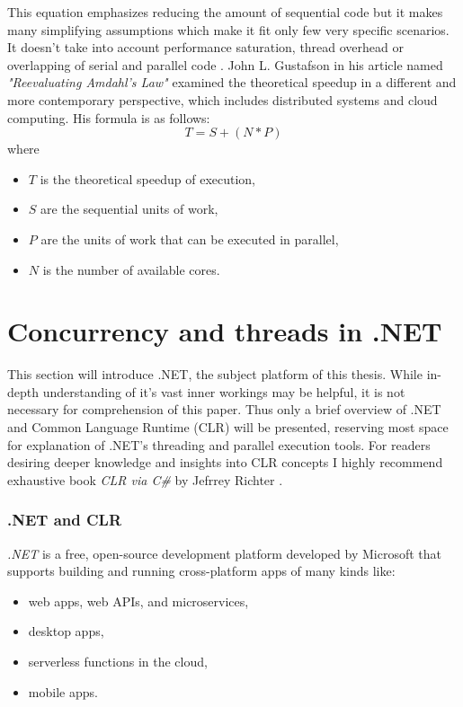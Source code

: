 This equation emphasizes reducing the amount of sequential code but it makes many simplifying assumptions which make it fit only few very specific scenarios. It doesn't take into account performance saturation, thread overhead or overlapping of serial and parallel code \cite{Popov2010}.
John L. Gustafson in his article named \emph{"Reevaluating Amdahl's Law"} \cite{Gustafson1988} examined the theoretical speedup in a different and more contemporary perspective, which includes distributed systems and cloud computing. His formula is as follows: 
\begin{equation}
T = S + (N*P)
\end{equation}
where
\begin{itemize}
	\item $T$ is the theoretical speedup of execution,
	\item $S$ are the sequential units of work,
	\item $P$ are the units of work that can be executed in parallel,
	\item $N$ is the number of available cores.
\end{itemize}

\section{Concurrency and threads in .NET}
This section will introduce .NET, the subject platform of this thesis. While in-depth understanding of it's vast inner workings may be helpful, it is not necessary for comprehension of this paper. Thus only a brief overview of .NET and Common Language Runtime (CLR) will be presented, reserving most space for explanation of .NET's threading and parallel execution tools. For readers desiring deeper knowledge and insights into CLR concepts I highly recommend exhaustive book \emph{CLR via C\#} by Jefrrey Richter \cite{Richter2012}.

\subsubsection{.NET and CLR}
\emph{.NET} is a free, open-source development platform developed by Microsoft that supports building and running cross-platform apps of many kinds like:
\begin{itemize}
	\item web apps, web APIs, and microservices,
	\item desktop apps,
	\item serverless functions in the cloud,
	\item mobile apps.
\end{itemize}

